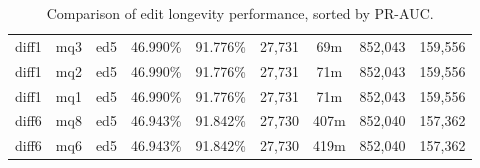 \begin{sidewaystable}[!ph]
\begin{center}
\begin{tabular}{|c|c|c||c|c||c|c|c|c|}
diff1 & mq3 & ed5 & 46.990\% & 91.776\% & 27,731 & 69m & 852,043 & 159,556 \\
diff1 & mq2 & ed5 & 46.990\% & 91.776\% & 27,731 & 71m & 852,043 & 159,556 \\
diff1 & mq1 & ed5 & 46.990\% & 91.776\% & 27,731 & 71m & 852,043 & 159,556 \\
diff6 & mq8 & ed5 & 46.943\% & 91.842\% & 27,730 & 407m & 852,040 & 157,362 \\
diff6 & mq6 & ed5 & 46.943\% & 91.842\% & 27,730 & 419m & 852,040 & 157,362 \\
\hline
\end{tabular}
\end{center}
\caption{Comparison of edit longevity performance,
    sorted by PR-AUC.}
\label{tab:editshoutA}
\end{sidewaystable}
\clearpage
